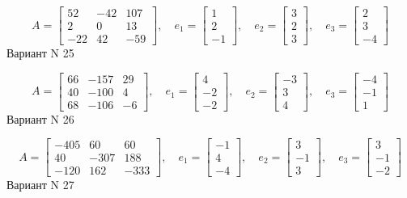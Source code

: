 \documentclass[11pt]{report}
\begin{document}
$$A = \left[\begin{matrix}52 & -42 & 107\\2 & 0 & 13\\-22 & 42 & -59\end{matrix}\right],\quad e_1 = \left[\begin{matrix}1\\2\\-1\end{matrix}\right],\quad e_2 = \left[\begin{matrix}3\\2\\3\end{matrix}\right],\quad e_3 = \left[\begin{matrix}2\\3\\-4\end{matrix}\right]$$Вариант N 25

$$A = \left[\begin{matrix}66 & -157 & 29\\40 & -100 & 4\\68 & -106 & -6\end{matrix}\right],\quad e_1 = \left[\begin{matrix}4\\-2\\-2\end{matrix}\right],\quad e_2 = \left[\begin{matrix}-3\\3\\4\end{matrix}\right],\quad e_3 = \left[\begin{matrix}-4\\-1\\1\end{matrix}\right]$$Вариант N 26

$$A = \left[\begin{matrix}-405 & 60 & 60\\40 & -307 & 188\\-120 & 162 & -333\end{matrix}\right],\quad e_1 = \left[\begin{matrix}-1\\4\\-4\end{matrix}\right],\quad e_2 = \left[\begin{matrix}3\\-1\\3\end{matrix}\right],\quad e_3 = \left[\begin{matrix}3\\-1\\-2\end{matrix}\right]$$Вариант N 27
\end{document}
